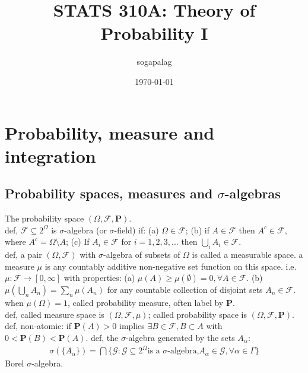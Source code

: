 \documentclass[paper=a4, fontsize=11pt]{scrartcl} %
\title{STATS 310A: Theory of Probability I}
\author{sogapalag}
\date{\normalsize\today}
\numberwithin{equation}{section} %
\numberwithin{figure}{section} %
\numberwithin{table}{section} %
\begin{document}
\maketitle

\section{Probability, measure and integration}
\subsection{Probability spaces, measures and $\sigma$-algebras}
The probability space $(\Omega,\mathcal{F},\mathbf{P})$.\\
def, $\mathcal{F}\subseteq 2^\Omega$ is $\sigma$-algebra (or $\sigma$-field) if: (a) $\Omega\in \mathcal{F}$; (b) if $A\in \mathcal{F}$ then $A^c\in \mathcal{F}$, where $A^c=\Omega\setminus A$; (c) If $A_i\in \mathcal{F}$ for $i=1,2,3,...$ then $\bigcup_i A_i\in \mathcal{F}$.\\
def, a pair $(\Omega, \mathcal{F})$ with $\sigma$-algebra of subsets of $\Omega$ is called a measurable space. a measure $\mu$ is any countably additive non-negative set function on this space. i.e. $\mu: \mathcal{F}\rightarrow [0,\infty]$ with properties: (a) $\mu(A)\geq \mu(\emptyset)=0, \forall A\in \mathcal{F}$. (b) $\mu(\bigcup_n A_n) = \sum_n \mu(A_n) $ for any countable collection of disjoint sets $A_n\in \mathcal{F}$.\\
when $\mu(\Omega)=1$, called probability measure, often label by $\mathbf{P}$.\\
def, called measure space is $(\Omega,\mathcal{F},\mu)$; called probability space is $(\Omega, \mathcal{F}, \mathbf{P})$.\\
def, non-atomic: if $\mathbf{P}(A)>0$ implies $\exists B\in \mathcal{F}, B\subset A$ with $0<\mathbf{P}(B)<\mathbf{P}(A)$.
def, the $\sigma$-algebra generated by the sets $A_\alpha$:
\begin{align}
	\sigma(\{A_\alpha\}) = \bigcap \{\mathcal{G}: \mathcal{G}\subseteq 2^\Omega \text{is a $\sigma$-algebra,} A_\alpha\in \mathcal{G},\forall\alpha\in \Gamma\}
\end{align}
Borel $\sigma$-algebra.\\
\end{document}
